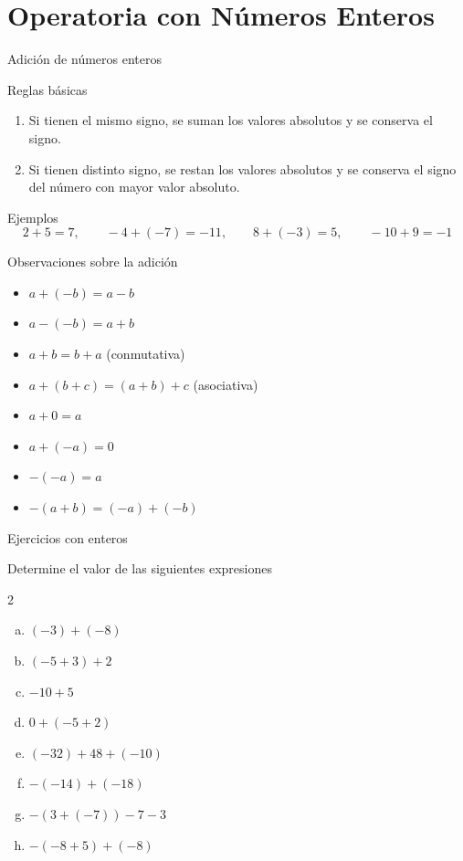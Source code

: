 \documentclass[handout,aspectratio=169,10pt]{beamer}
\begin{document}
	\section{Operatoria con Números Enteros}
	
	\begin{frame}{Adición de números enteros}
		\begin{block}{Reglas básicas}
			\begin{enumerate}[<+->]
				\item Si tienen el mismo signo, se suman los valores absolutos y se conserva el signo.
				\item Si tienen distinto signo, se restan los valores absolutos y se conserva el signo del número con mayor valor absoluto.
			\end{enumerate}
		\end{block}
		
		\begin{exampleblock}{Ejemplos}
			\[
			2+5=7,\qquad -4+(-7)=-11,\qquad 8+(-3)=5,\qquad -10+9=-1
			\]
		\end{exampleblock}
	\end{frame}
	
	\begin{frame}{Observaciones sobre la adición}
		\begin{itemize}[<+->]
			\item \(a+(-b)=a-b\)
			\item \(a-(-b)=a+b\)
			\item \(a+b=b+a\) \hfill (conmutativa)
			\item \(a+(b+c)=(a+b)+c\) \hfill (asociativa)
			\item \(a+0=a\)
			\item \(a+(-a)=0\)
			\item \(-(-a)=a\)
			\item \(-(a+b)=(-a)+(-b)\)
		\end{itemize}
	\end{frame}
	
	\begin{frame}{Ejercicios con enteros}
		\begin{block}{Determine el valor de las siguientes expresiones}
			\begin{multicols}{2}
				\begin{enumerate}[a)]
					\item \((-3)+(-8)\)
					\item \((-5+3)+2\)
					\item \(-10+5\)
					\item \(0+(-5+2)\)
					\item \((-32)+48+(-10)\)
					\item \(-(-14)+(-18)\)
					\item \(-(3+(-7))-7-3\)
					\item \(-(-8+5)+(-8)\)
				\end{enumerate}
			\end{multicols}
		\end{block}
	\end{frame}
	
\end{document}
